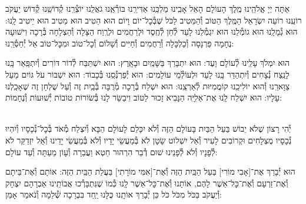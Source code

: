 \documentclass[twoside, openany, parskip=half, 11pt]{book}
\begin{document}
אַתָּה יְיָ אֱלֹהֵֽינוּ מֶֽלֶךְ הָעוֹלָם הָאֵל אָבִֽינוּ מַלְכֵּֽנוּ אַדִּירֵֽנוּ בּוֹרְ֯אֵֽנוּ גֹאֲלֵֽנוּ יוֹצְ֯רֵֽנוּ קְ֯דוֹשֵֽׁנוּ קְ֯דוֹשׁ יַעֲקֹב רוֹעֵֽנוּ רוֹעֵה יִשְׂרָאֵל הַמֶּֽלֶךְ הַטּוֹב וְ֯הַמֵּטִיב לַכֹּל שֶׁבְּ֯כׇל־יוֹם וָיוֹם הוּא הֵטִיב הוּא מֵטִיב הוּא יֵיטִיב לָֽנוּ: הוּא גְ֯מָלָֽנוּ הוּא גוֹמְ֯לֵנוּ הוּא יִגְמְ֯לֵנוּ לָעַד לְ֯חֵן לְ֯חֶֽסֶד וּלְרַחֲמִים וּלְרֶֽוַח הַצָּלָה וְ֯הַצְלָחָה בְּ֯רָכָה וִישׁוּעָה נֶחָמָה פַּרְנָסָה וְ֯כַלְכָּלָה וְ֯רַחֲמִים וְ֯חַיִּים וְ֯שָׁלוֹם וְ֯כׇל־טוֹב וּמִכׇּל־טוֹב אַל יְ֯חַסְּ֯רֵֽנוּ:

הוּא יִמְלֹךְ עָלֵֽינוּ לְ֯עוֹלָם וָעֶד:
הוּא יִתְבָּרַךְ בַּשָּׁמַֽיִם וּבָאָֽרֶץ:
הוּא יִשְׁתַּבַּח לְ֯דוֹר דּוֹרִים וְ֯יִתְפָּֽאַר בָּֽנוּ לָנֵֽצַח נְ֯צָחִים
וְ֯יִתְהַדַּר בָּֽנוּ לָעַד וּלְעוֹלְ֯מֵי עוֹלָמִים:
הוּא יְ֯פַרְנְ֯סֵֽנוּ בְּ֯כָבוֹד:
הוּא יִשְׁבּוֹר עֹל גּוֹיִם מֵעַל צַוָּארֵֽנוּ וְ֯הוּא יוֹלִיכֵֽנוּ קוֹמֲמִיּוּת לְ֯אַרְצֵֽנוּ:
הוּא יִשְׁלַח בְּ֯רָכָה מְ֯רֻבָּה בְּ֯בַֽיִת זֶה וְ֯עַל שֻׁלְחָן זֶה שֶׁאָכַֽלְנוּ עָלָיו:
הוּא יִשְׁלַח לָֽנוּ אֶת־אֵלִיָּֽה הַנָּבִיא זָכוּר לַטּוֹב וִיבַשֵּׂר לָנוּ בְּ֯שׂוֹרוֹת טוֹבוֹת יְ֯שׁוּעוֹת וְ֯נֶחָמוֹת:


\begin{footnotesize}
\\
יְ֯הִי רָצוֹן שֶׁלֹא יֵבוֹשׁ בַּעַל הַבַּיִת בָּעוֹלָם הַזֶּה וְ֯לֹא יִכָּלֵם לָעוֹלָם הַבָּא וְ֯יִצְלַח מְ֯אֹד בְּ֯כׇל־נְ֯כָסָיו וְ֯יִהְיוּ נְ֯כָסָיו מֻצְלָחִים וּקְרוֹבִים לָעִיר וְ֯אַל יִשְׁלוֹט שָׂטָן לֹא בְּ֯מַעֲשֵׂי יָדָיו וְ֯לֹא בְּ֯מַעֲשֵׂי יָדֵינוּ וְ֯אַל יִזְדַקֵּר לֹא לְ֯פָנָיו וְ֯לֹא לְ֯פָנֵינוּ שׁוּם דְ֯בַר הִרְהוּר חֵטְא וַעֲבֵרָה וְ֯עָוֹן מֵעַתָּה וְ֯עַד עוֹלָם:

\end{footnotesize}

הוּא יְ֯בָרֵךְ אֶת־[אָבִי מוֹרִי] בַּעַל הַבַּֽיִת הַזֶּה וְ֯אֶת־[אִמִּי מוֹרָתִי] בַּעֲלַת הַבַּֽיִת הַזֶּה: אוֹתָם וְ֯אֶת־בֵּיתָם וְ֯אֶת־זַרְעָם וְ֯אֶת־כׇּל־אַשֶׁר לָהֶם, אוֹתָנוּ וְ֯אֶת־כׇּל־אַשֶׁר לָֽנוּ כְּ֯מוֹ שֶׁנִּתְבָּרְ֯כוּ אֲבוֹתֵֽינוּ אַבְרָהָם יִצְחָק וְ֯יַעֲקֹב בַּכֹּל מִכֹּל כֹּל כֵּן יְ֯בָרֵךְ אוֹתָֽנוּ כֻּלָּנוּ יַֽחַד בִּבְרָכָה שְׁ֯לֵמָה וְ֯נֹאמַר אָמֵן:
\end{document}
